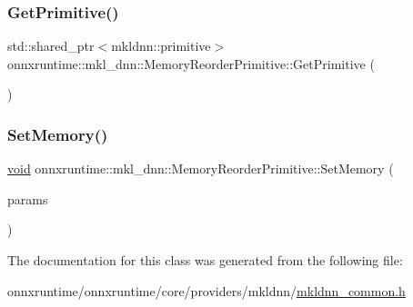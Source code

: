 \subsubsection{\texorpdfstring{Get\+Primitive()}{GetPrimitive()}}
{\footnotesize\ttfamily std\+::shared\+\_\+ptr$<$mkldnn\+::primitive$>$ onnxruntime\+::mkl\+\_\+dnn\+::\+Memory\+Reorder\+Primitive\+::\+Get\+Primitive (\begin{DoxyParamCaption}{ }\end{DoxyParamCaption})\hspace{0.3cm}{\ttfamily [inline]}}

\mbox{\label{classonnxruntime_1_1mkl__dnn_1_1MemoryReorderPrimitive_a14bfc8f4f82ef8f01f5b2da2e560e57a}} 
\subsubsection{\texorpdfstring{Set\+Memory()}{SetMemory()}}
{\footnotesize\ttfamily \mbox{\hyperlink{mlasi_8h_a88f941d423cb2a819b70a1358982b1a6}{void}} onnxruntime\+::mkl\+\_\+dnn\+::\+Memory\+Reorder\+Primitive\+::\+Set\+Memory (\begin{DoxyParamCaption}\item[{const \mbox{\hyperlink{structonnxruntime_1_1mkl__dnn_1_1MemoryReorderParams}{Memory\+Reorder\+Params}} \&}]{params }\end{DoxyParamCaption})\hspace{0.3cm}{\ttfamily [inline]}}



The documentation for this class was generated from the following file\+:\begin{DoxyCompactItemize}
\item 
onnxruntime/onnxruntime/core/providers/mkldnn/\mbox{\hyperlink{mkldnn__common_8h}{mkldnn\+\_\+common.\+h}}\end{DoxyCompactItemize}
